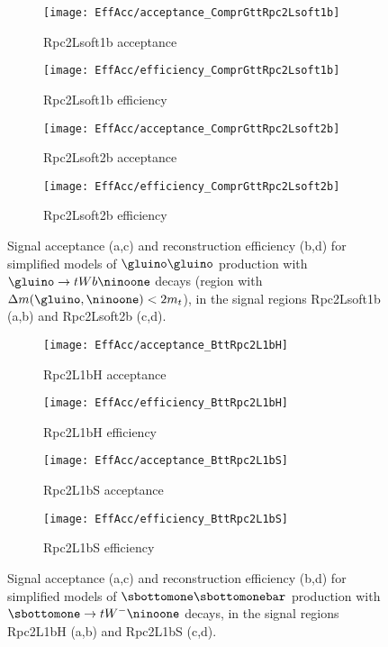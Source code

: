 \begin{figure}[ht]
\centering
\begin{subfigure}[t]{0.49\textwidth}\texttt{[image: EffAcc/acceptance\_ComprGttRpc2Lsoft1b]}\caption{Rpc2Lsoft1b acceptance}\end{subfigure}
\begin{subfigure}[t]{0.49\textwidth}\texttt{[image: EffAcc/efficiency\_ComprGttRpc2Lsoft1b]}\caption{Rpc2Lsoft1b efficiency}\end{subfigure}
\begin{subfigure}[t]{0.49\textwidth}\texttt{[image: EffAcc/acceptance\_ComprGttRpc2Lsoft2b]}\caption{Rpc2Lsoft2b acceptance}\end{subfigure}
\begin{subfigure}[t]{0.49\textwidth}\texttt{[image: EffAcc/efficiency\_ComprGttRpc2Lsoft2b]}\caption{Rpc2Lsoft2b efficiency}\end{subfigure}
\caption{Signal acceptance (a,c) and reconstruction efficiency (b,d) 
for simplified models of $\gluino\gluino$ production with $\gluino\to tWb\ninoone$ decays (region with $\Delta m(\gluino,\ninoone)<2m_t$), 
in the signal regions Rpc2Lsoft1b (a,b) and Rpc2Lsoft2b (c,d).}
\end{figure}

\begin{figure}[ht]
\centering
\begin{subfigure}[t]{0.49\textwidth}\texttt{[image: EffAcc/acceptance\_BttRpc2L1bH]}\caption{Rpc2L1bH acceptance}\end{subfigure}
\begin{subfigure}[t]{0.49\textwidth}\texttt{[image: EffAcc/efficiency\_BttRpc2L1bH]}\caption{Rpc2L1bH efficiency}\end{subfigure}
\begin{subfigure}[t]{0.49\textwidth}\texttt{[image: EffAcc/acceptance\_BttRpc2L1bS]}\caption{Rpc2L1bS acceptance}\end{subfigure}
\begin{subfigure}[t]{0.49\textwidth}\texttt{[image: EffAcc/efficiency\_BttRpc2L1bS]}\caption{Rpc2L1bS efficiency}\end{subfigure}
\caption{Signal acceptance (a,c) and reconstruction efficiency (b,d) 
for simplified models of $\sbottomone\sbottomonebar$ production with $\sbottomone\to tW^{-}\ninoone$ decays, 
in the signal regions Rpc2L1bH (a,b) and Rpc2L1bS (c,d).}
\end{figure}


